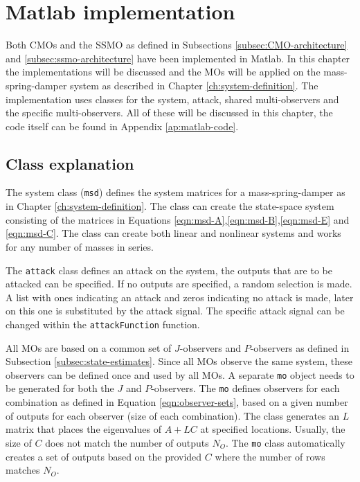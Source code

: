 \section{Matlab implementation}\label{ch:matlab-implementation}
Both CMOs and the SSMO as defined in Subsections \ref{subsec:CMO-architecture} and \ref{subsec:ssmo-architecture} have been implemented in Matlab. In this chapter the implementations will be discussed and the MOs will be applied on the mass-spring-damper system as described in Chapter \ref{ch:system-definition}. The implementation uses classes for the system, attack, shared multi-observers and the specific multi-observers. All of these will be discussed in this chapter, the code itself can be found in Appendix \ref{ap:matlab-code}.

\subsection{Class explanation}
The system class (\texttt{msd}) defines the system matrices for a mass-spring-damper as in Chapter \ref{ch:system-definition}. The class can create the state-space system consisting of the matrices in Equations \eqref{eqn:msd-A},\eqref{eqn:msd-B},\eqref{eqn:msd-E} and \eqref{eqn:msd-C}. The class can create both linear and nonlinear systems and works for any number of masses in series.

The \texttt{attack} class defines an attack on the system, the outputs that are to be attacked can be specified. If no outputs are specified, a random selection is made. A list with ones indicating an attack and zeros indicating no attack is made, later on this one is substituted by the attack signal. The specific attack signal can be changed within the \texttt{attackFunction} function.

All MOs are based on a common set of $J$-observers and $P$-observers as defined in Subsection \ref{subsec:state-estimates}. Since all MOs observe the same system, these observers can be defined once and used by all MOs. A separate \texttt{mo} object needs to be generated for both the $J$ and $P$-observers. The \texttt{mo} defines observers for each combination as defined in Equation \eqref{eqn:observer-sets}, based on a given number of outputs for each observer (size of each combination). The class generates an $L$ matrix that places the eigenvalues of $A + LC$ at specified locations. Usually, the size of $C$ does not match the number of outputs $N_O$. The \texttt{mo} class automatically creates a set of outputs based on the provided $C$ where the number of rows matches $N_O$.

